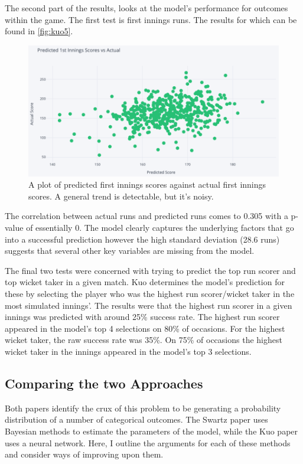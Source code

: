 The second part of the results, looks at the model’s performance for outcomes within the game. The first test is first innings runs. The results for which can be found in \autoref{fig:kuo5}.

\begin{figure}
    \centering
    \includegraphics[width=0.9\columnwidth]{images/kuo5.png}
    \caption{A plot of predicted first innings scores against actual first innings scores. A general trend is detectable, but it's noisy.}
    \label{fig:kuo5}
\end{figure}

\clearpage

The correlation between actual runs and predicted runs comes to 0.305 with a p-value of essentially 0. The model clearly captures the underlying factors that go into a successful prediction however the high standard deviation (28.6 runs) suggests that several other key variables are missing from the model.

The final two tests were concerned with trying to predict the top run scorer and top wicket taker in a given match. Kuo determines the model’s prediction for these by selecting the player who was the highest run scorer/wicket taker in the most simulated innings’. The results were that the highest run scorer in a given innings was predicted with around 25\% success rate. The highest run scorer appeared in the model’s top 4 selections on 80\% of occasions. For the highest wicket taker, the raw success rate was 35\%. On 75\% of occasions the highest wicket taker in the innings appeared in the model’s top 3 selections.

\subsection{Comparing the two Approaches}

Both papers identify the crux of this problem to be generating a probability distribution of a number of categorical outcomes. The Swartz paper uses Bayesian methods to estimate the parameters of the model, while the Kuo paper uses a neural network. Here, I outline the arguments for each of these methods and consider ways of improving upon them.

